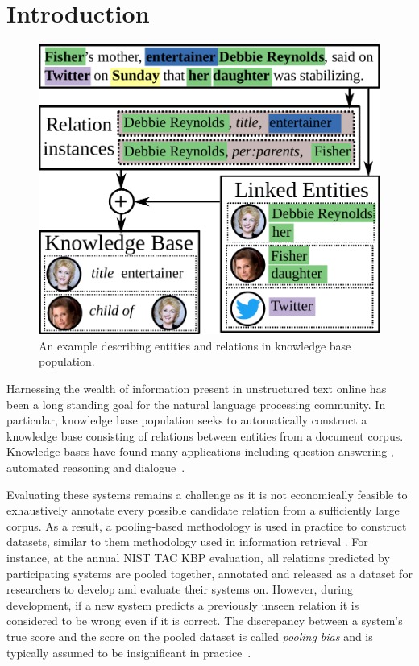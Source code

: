 \section{Introduction}
\label{sec:intro}

\begin{figure}[t]
  \centering
  \includegraphics[width=0.6\columnwidth]{figures/entities-example.pdf}
  \caption[Example: KBP]{\label{fig:example} An example describing entities and relations in knowledge base population.}
\end{figure}

Harnessing the wealth of information present in unstructured text online has been a long standing goal for the natural language processing community.
In particular, knowledge base population seeks to automatically construct a knowledge base consisting of relations between entities from a document corpus. %
Knowledge bases have found many applications including question answering \citep{berant2013freebase, fader2014open,reddy2014large}, automated reasoning \citep{kalyanpur2012structured} and dialogue~\citep{han2015exploiting}.

Evaluating these systems remains a challenge as it is not economically feasible to exhaustively annotate every possible candidate relation from a sufficiently large corpus.
As a result, a pooling-based methodology is used in practice to construct datasets, similar to them methodology used in information retrieval \citep{sparck1975report, harman1993trec}.
For instance, at the annual NIST TAC KBP evaluation, all relations predicted by participating systems are pooled together, annotated and released as a dataset for researchers to develop and evaluate their systems on.
However, during development, if a new system predicts a previously unseen relation it is considered to be wrong even if it is correct.
The discrepancy between a system's true score and the score on the pooled dataset is called \emph{pooling bias} and is typically assumed to be insignificant in practice~\citep{zobel1998reliable}.

